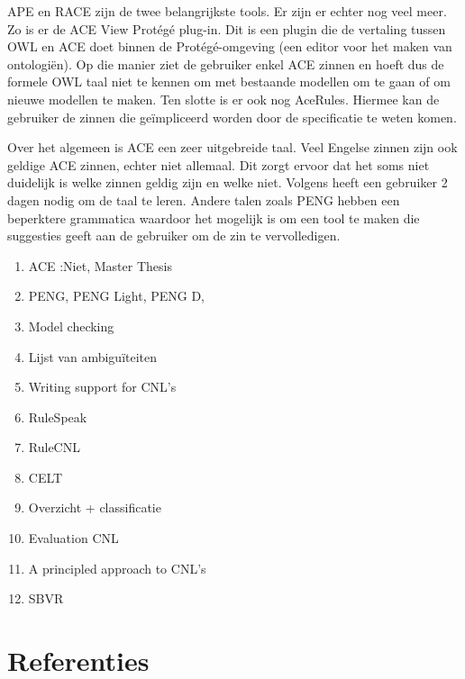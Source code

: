 \documentclass[]{article}
\begin{document}
APE en RACE zijn de twee belangrijkste tools. Er zijn er echter nog veel meer.
Zo is er de ACE View Protégé plug-in. Dit is een plugin die de vertaling tussen
OWL en ACE doet binnen de Protégé-omgeving (een editor voor het maken van
ontologiën). Op die manier ziet de gebruiker enkel ACE zinnen en hoeft dus de
formele OWL taal niet te kennen om met bestaande modellen om te gaan of om
nieuwe modellen te maken. Ten slotte is er ook nog AceRules. Hiermee kan de
gebruiker de zinnen die geïmpliceerd worden door de specificatie te weten komen.

Over het algemeen is ACE een zeer uitgebreide taal. Veel Engelse zinnen zijn ook
geldige ACE zinnen, echter niet allemaal. Dit zorgt ervoor dat het soms niet
duidelijk is welke zinnen geldig zijn en welke niet. Volgens \cite{Fuchs2008}
heeft een gebruiker 2 dagen nodig om de taal te leren. Andere talen zoals PENG
hebben een beperktere grammatica waardoor het mogelijk is om een tool te maken
die suggesties geeft aan de gebruiker om de zin te vervolledigen.

\begin{enumerate}
  \item ACE\cite{Fuchs2008} \cite{Fuchs}:Niet, Master Thesis\cite{Dellis2010} 
  \item PENG\cite{Schwitter2003, Schwitter2006}, PENG Light\cite{Schwitter2008},
    PENG D\cite{Schwitter2004},\cite{Schwitter2005} 
  \item Model checking\cite{Flake2002, Konrad2005, Nelken, Jak2008}
  \item Lijst van ambiguïteiten \cite{Berry2003} 
  \item Writing support for CNL's\cite{Kuhn2008} 
  \item RuleSpeak\cite{Ross2009a, Ross2013, Ross2013a, Ross2009} 
  \item RuleCNL\cite{Njonko2014} 
  \item CELT\cite{Pease2010, Dellis2010}
  \item Overzicht + classificatie\cite{Kuhn2014}
  \item Evaluation CNL\cite{Kuhn2010}
  \item A principled approach to CNL's\cite{Kuhn2013} 
  \item SBVR\cite{Spreeuwenberg2010, Levy2013} 
\end{enumerate}
			
\section{Referenties}


\end{document}

